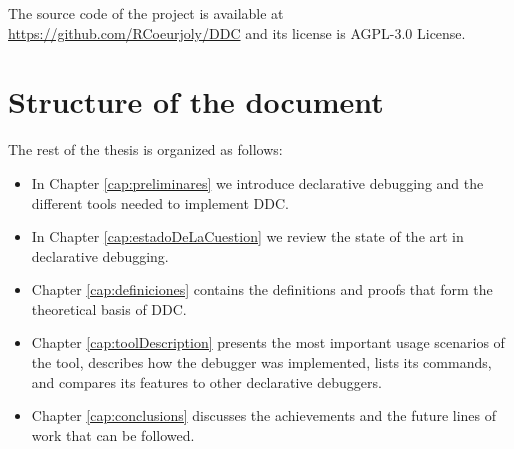 The source code of the project is available at \url{https://github.com/RCoeurjoly/DDC} 
and its license is AGPL-3.0 License.

\section{Structure of the document}
The rest of the thesis is organized as follows:
\begin{itemize}
    \item In Chapter \ref{cap:preliminares} we introduce declarative debugging and the different tools needed to implement DDC.
    \item  In Chapter \ref{cap:estadoDeLaCuestion} we review the state of the art in declarative debugging. 
    \item Chapter \ref{cap:definiciones} contains the definitions and proofs that form the theoretical basis of DDC. 
    \item Chapter \ref{cap:toolDescription} presents the most important usage scenarios of the tool, describes how the debugger was implemented, lists its commands, and compares its features to other declarative debuggers. 
    \item Chapter \ref{cap:conclusions} discusses the achievements and the future lines of work that can be followed.
\end{itemize}

